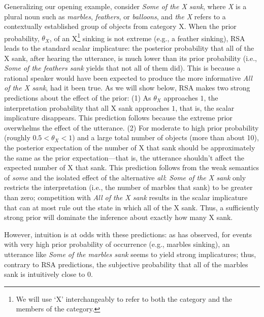 \documentclass[10pt,letterpaper]{article}
\begin{document}
Generalizing our opening example, consider \emph{Some of the X sank}, where \emph{X} is a plural noun such as \emph{marbles}, \emph{feathers}, or \emph{balloons}, and \emph{the X} refers to a contextually established group of objects from category X. When the prior probability, $\theta_{X}$, of an X\footnote{We will use `X' interchangeably to refer to both the category and the members of the category.} sinking is not extreme (e.g., a feather sinking), RSA leads to the standard scalar implicature: the posterior probability that all of the X sank, after hearing the utterance, is much lower than its prior probability (i.e., \emph{Some of the feathers sank} yields that not all of them did). This is because a rational speaker would have been expected to produce the more informative \emph{All of the X sank}, had it been true.
As we will show below, RSA makes two strong predictions about the effect of the prior: (1) As $\theta_{X}$ approaches $1$, the interpretation probability that all X sank approaches $1$, that is, the scalar implicature disappears. 
This prediction follows because the extreme prior overwhelms the effect of the utterance.
(2) For moderate to high prior probability (roughly $0.5{<}\theta_{X}{<}1$) and a large total number of objects (more than about 10), the posterior expectation of the number of X that sank should be approximately the same as the prior expectation---that is, the utterance shouldn't affect the expected number of X that sank. 
%
This prediction follows from the weak semantics of \emph{some} and the isolated effect of the alternative \emph{all}: \emph{Some of the X sank} only restricts the interpretation (i.e., the number of marbles that sank) to be greater than zero; competition with \emph{All of the X sank} results in the scalar implicature that can at most rule out the state in which all of the X sank. Thus, a sufficiently strong prior will dominate the inference about exactly how many X sank.



However, intuition is at odds with these predictions: as  has observed, for events with very high prior probability of occurrence (e.g., marbles sinking), an utterance like  \emph{Some of the marbles sank} seems to yield strong implicatures; thus, contrary to RSA predictions, the subjective probability that all of the marbles sank is intuitively close to 0. 
%
\end{document}
